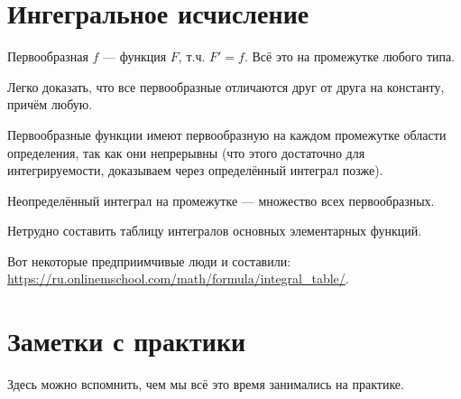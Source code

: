 \documentclass[12pt, a4paper]{article}
\begin{document}
  \section{Ингегральное исчисление}

  Первообразная $f$ — функция $F$, т.ч. $F' = f$. Всё это на промежутке любого типа.

  Легко доказать, что все первообразные отличаются друг от друга на константу, причём любую.

  Первообразные функции имеют первообразную на каждом промежутке области определения, так как они непрерывны (что этого достаточно для интегрируемости, доказываем через определённый интеграл позже).

  Неопределённый интеграл на промежутке — множество всех первообразных.

  Нетрудно составить таблицу интегралов основных элементарных функций.
  
  Вот некоторые предприимчивые люди и составили: \url{https://ru.onlinemschool.com/math/formula/integral_table/}.


  
  \section{Заметки с практики}\label{practice-notes}

  Здесь можно вспомнить, чем мы всё это время занимались на практике.
\end{document}
